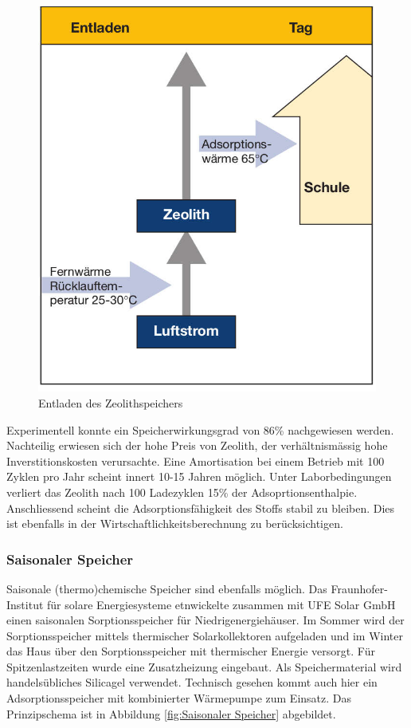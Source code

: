 \documentclass[11pt,a4paper]{scrartcl}
\begin{document}
\begin{figure}[h!]
\begin{center}
\includegraphics[scale=1]{images/Entladen.jpg}
\caption{Entladen des Zeolithspeichers \cite{BINE2}}
\label{fig:Entladen}
\end{center}
\end{figure}
Experimentell konnte ein Speicherwirkungsgrad von 86\% nachgewiesen werden.
Nachteilig erwiesen sich der hohe Preis von Zeolith, der verhältnismässig hohe
Inverstitionskosten verursachte. Eine Amortisation bei einem Betrieb mit 100
Zyklen pro Jahr scheint innert 10-15 Jahren möglich. Unter Laborbedingungen
verliert das Zeolith nach 100 Ladezyklen 15\% der Adsoprtionsenthalpie.
Anschliessend scheint die Adsorptionsfähigkeit des Stoffs stabil zu bleiben.
Dies ist ebenfalls in der Wirtschaftlichkeitsberechnung zu berücksichtigen.
\cite{BINE2}

\subsubsection{Saisonaler Speicher}
Saisonale (thermo)chemische Speicher sind ebenfalls möglich. Das Fraunhofer-
Institut für solare Energiesysteme etnwickelte zusammen mit UFE Solar GmbH einen
saisonalen Sorptionsspeicher für Niedrigenergiehäuser. Im Sommer wird der
Sorptionsspeicher mittels thermischer Solarkollektoren aufgeladen und im Winter das Haus über den
Sorptionsspeicher mit thermischer Energie versorgt. Für Spitzenlastzeiten wurde
eine Zusatzheizung eingebaut. Als Speichermaterial wird handelsübliches
Silicagel verwendet. Technisch gesehen kommt auch hier ein Adsorptionsspeicher
mit kombinierter Wärmepumpe zum Einsatz. Das Prinzipschema ist in Abbildung \ref{fig:Saisonaler Speicher}
abgebildet.
\end{document}
